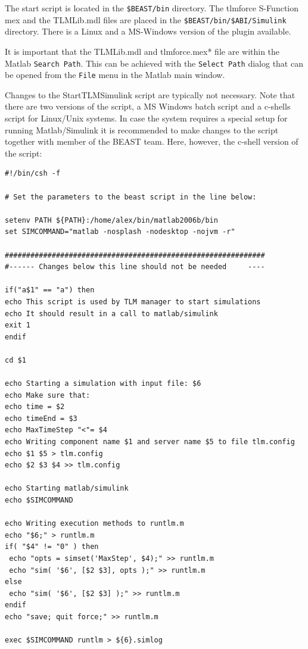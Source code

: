 The start script is located in the {\tt \$BEAST/bin} directory. 
The tlmforce S-Function mex and the TLMLib.mdl files are placed in the {\tt \$BEAST/bin/\$ABI/Simulink} directory. 
There is a Linux and a MS-Windows version of the plugin available.

It is important that the TLMLib.mdl and tlmforce.mex* file are within the Matlab {\tt Search Path}. 
This can be achieved with the {\tt Select Path} dialog that can be opened from the {\tt File} menu in the Matlab main window.

Changes to the StartTLMSimulink script are typically not necessary. 
Note that there are two versions of the script, a MS Windows batch script and a c-shells script for Linux/Unix
systems. 
In case the system requires a special setup for running Matlab/Simulink it is recommended to make changes to the script together with member of the BEAST team. 
Here, however, the c-shell version of the script:
\begin{verbatim}
#!/bin/csh -f

# Set the parameters to the beast script in the line below:

setenv PATH ${PATH}:/home/alex/bin/matlab2006b/bin
set SIMCOMMAND="matlab -nosplash -nodesktop -nojvm -r"

#############################################################
#------ Changes below this line should not be needed     ----

if("a$1" == "a") then
echo This script is used by TLM manager to start simulations
echo It should result in a call to matlab/simulink
exit 1
endif

cd $1

echo Starting a simulation with input file: $6
echo Make sure that:
echo time = $2
echo timeEnd = $3
echo MaxTimeStep "<"= $4
echo Writing component name $1 and server name $5 to file tlm.config
echo $1 $5 > tlm.config
echo $2 $3 $4 >> tlm.config

echo Starting matlab/simulink
echo $SIMCOMMAND

echo Writing execution methods to runtlm.m
echo "$6;" > runtlm.m
if( "$4" != "0" ) then
 echo "opts = simset('MaxStep', $4);" >> runtlm.m
 echo "sim( '$6', [$2 $3], opts );" >> runtlm.m
else
 echo "sim( '$6', [$2 $3] );" >> runtlm.m
endif
echo "save; quit force;" >> runtlm.m

exec $SIMCOMMAND runtlm > ${6}.simlog
\end{verbatim}


